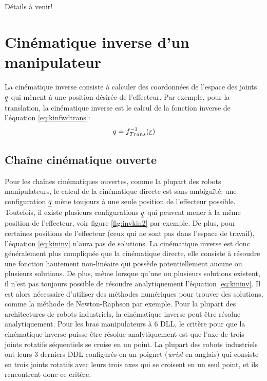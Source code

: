Détails à venir!





\newpage
\section{Cinématique inverse d'un manipulateur}
\label{sec:invkin}

La cinématique inverse consiste à calculer des coordonnées de l'espace des joints $\underline{q}$ qui mènent à une position désirée de l'effecteur. Par exemple, pour la translation, la cinématique inverse est le calcul de la fonction inverse de l'équation \eqref{eq:kinfwdtrans}:
\begin{align}
\underline{q} = f^{-1}_{Trans}( \underline{r} )
\label{eq:kininv}
\end{align} 


\subsection{Chaîne cinématique ouverte}

Pour les chaînes cinématiques ouvertes, comme la plupart des robots manipulateurs, le calcul de la cinématique directe est sans ambiguïté: une configuration $\underline{q}$ mène toujours à une seule position de l'effecteur possible. Toutefois, il existe plusieurs configurations $\underline{q}$ qui peuvent mener à la même position de l'effecteur, voir figure \ref{fig:invkin2} par exemple. De plus, pour certaines positions de l'effecteur (ceux qui ne sont pas dans l'espace de travail), l'équation \eqref{eq:kininv} n'aura pas de solutions. La cinématique inverse est donc généralement plus compliquée que la cinématique directe, elle consiste à résoudre une fonction hautement non-linéaire qui possède potentiellement aucune ou plusieurs solutions. De plus, même lorsque qu'une ou plusieurs solutions existent, il n'est pas toujours possible de résoudre analytiquement l'équation \eqref{eq:kininv}. Il est alors nécessaire d'utiliser des méthodes numériques pour trouver des solutions, comme la méthode de Newton-Raphson par exemple. Pour la plupart des architectures de robots industriels, la cinématique inverse peut être résolue analytiquement. Pour les bras manipulateurs à 6 DLL, le critère pour que la cinématique inverse puisse être résolue analytiquement est que l'axe de trois joints rotatifs séquentiels se croise en un point. La plupart des robots industriels ont leurs 3 derniers DDL configurés en un poignet (\textit{wrist} en anglais) qui consiste en trois joints rotatifs avec leurs trois axes qui se croisent en un seul point, et ils rencontrent donc ce critère.

